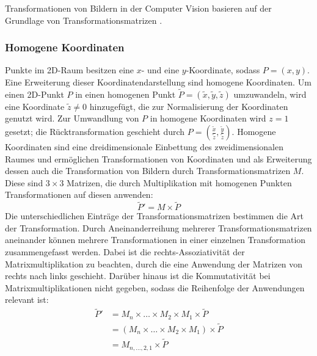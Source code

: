 Transformationen von Bildern in der Computer Vision basieren auf der Grundlage von Transformationsmatrizen \cite{transformationen_1,transformationen_2,cv_general}.

\subsubsection{Homogene Koordinaten}
\label{sec:homogene_koordinaten}

Punkte im 2D-Raum besitzen eine $x$- und eine $y$-Koordinate, sodass $P = (x, y)$. Eine Erweiterung dieser Koordinatendarstellung sind homogene Koordinaten. Um einen 2D-Punkt $P$ in einen homogenen Punkt $\widetilde{P} = (\widetilde{x}, \widetilde{y}, \widetilde{z})$ umzuwandeln, wird eine Koordinate $\widetilde{z} \neq 0$ hinzugefügt, die zur Normalisierung der Koordinaten genutzt wird. Zur Umwandlung von $P$ in homogene Koordinaten wird $z=1$ gesetzt; die Rücktransformation geschieht durch $P = (\frac{\widetilde{x}}{\widetilde{z}}, \frac{\widetilde{y}}{\widetilde{z}})$. Homogene Koordinaten sind eine dreidimensionale Einbettung des zweidimensionalen Raumes und ermöglichen Transformationen von Koordinaten und als Erweiterung dessen auch die Transformation von Bildern durch Transformationsmatrizen $M$. Diese sind $3 \times 3$ Matrizen, die durch Multiplikation mit homogenen Punkten Transformationen auf diesen anwenden:
\[ \widetilde{P}' = M \times \widetilde{P} \]
Die unterschiedlichen Einträge der Transformationsmatrizen bestimmen die Art der Transformation. Durch Aneinanderreihung mehrerer Transformationsmatrizen aneinander können mehrere Transformationen in einer einzelnen Transformation zusammengefasst werden. Dabei ist die rechts-Assoziativität der Matrixmultiplikation zu beachten, durch die eine Anwendung der Matrizen von rechts nach links geschieht. Darüber hinaus ist die Kommutativität bei Matrixmultiplikationen nicht gegeben, sodass die Reihenfolge der Anwendungen relevant ist:
{\setlength{\belowdisplayskip}{0.5ex}
\begin{align*}
    \widetilde{P}' & = M_n \times \dots \times M_2 \times M_1 \times \widetilde{P}   \\
                   & = (M_n \times \dots \times M_2 \times M_1) \times \widetilde{P} \\
                   & = M_{n, \dots, 2, 1} \times \widetilde{P}
\end{align*}}


